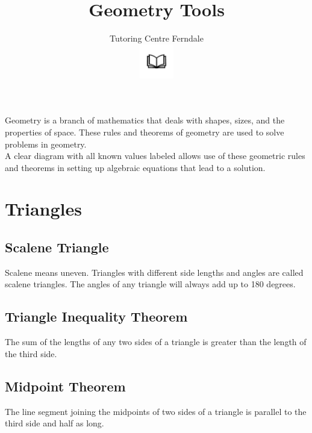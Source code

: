 \documentclass[12pt,a4paper]{article}
\title{Geometry Tools}
\author{Tutoring Centre Ferndale\\
\includegraphics[width=4em]{ApS_logo.png}}
\date{}
\begin{document}
\maketitle

\noindent

Geometry is a branch of mathematics that deals with shapes, sizes, and the properties of space. These rules and theorems of geometry are used to solve problems in geometry.\\

A clear diagram with all known values labeled allows use of these geometric rules and theorems in setting up algebraic equations that lead to a solution.

\section*{Triangles}

\subsection*{Scalene Triangle}
Scalene means uneven. Triangles with different side lengths and angles are called scalene triangles. The angles of any triangle will always add up to 180 degrees.

\begin{center}
\end{center}

\subsection*{Triangle Inequality Theorem}
The sum of the lengths of any two sides of a triangle is greater than the length of the third side.

\begin{center}
\end{center}

\newpage

\subsection*{Midpoint Theorem}
The line segment joining the midpoints of two sides of a triangle is parallel to the third side and half as long.
\end{document}
